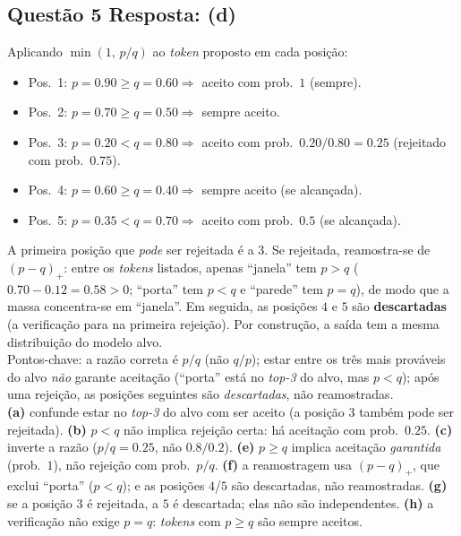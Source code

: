 \documentclass[11pt,a4paper]{article}
\begin{document}
\subsection*{Questão 5 \textemdash{} Resposta: (d)}
Aplicando $\min(1,\, p/q)$ ao \textit{token} proposto em cada posição:
\begin{itemize}
    \item Pos.\ 1: $p = 0.90 \ge q = 0.60 \Rightarrow$ aceito com prob.\ $1$ (sempre).
    \item Pos.\ 2: $p = 0.70 \ge q = 0.50 \Rightarrow$ sempre aceito.
    \item Pos.\ 3: $p = 0.20 < q = 0.80 \Rightarrow$ aceito com prob.\ $0.20/0.80 = 0.25$ (rejeitado com prob.\ $0.75$).
    \item Pos.\ 4: $p = 0.60 \ge q = 0.40 \Rightarrow$ sempre aceito (se alcançada).
    \item Pos.\ 5: $p = 0.35 < q = 0.70 \Rightarrow$ aceito com prob.\ $0.5$ (se alcançada).
\end{itemize}
A primeira posição que \emph{pode} ser rejeitada é a $3$. Se rejeitada, reamostra-se de $(p-q)_+$: entre os \textit{tokens} listados, apenas ``janela'' tem $p > q$ ($0.70 - 0.12 = 0.58 > 0$; ``porta'' tem $p < q$ e ``parede'' tem $p = q$), de modo que a massa concentra-se em ``janela''. Em seguida, as posições $4$ e $5$ são \textbf{descartadas} (a verificação para na primeira rejeição). Por construção, a saída tem a mesma distribuição do modelo alvo.\\
Pontos-chave: a razão correta é $p/q$ (não $q/p$); estar entre os três mais prováveis do alvo \emph{não} garante aceitação (``porta'' está no \textit{top-3} do alvo, mas $p < q$); após uma rejeição, as posições seguintes são \emph{descartadas}, não reamostradas.\\
\textbf{(a)} confunde estar no \textit{top-3} do alvo com ser aceito (a posição $3$ também pode ser rejeitada).
\textbf{(b)} $p < q$ não implica rejeição certa: há aceitação com prob.\ $0.25$.
\textbf{(c)} inverte a razão ($p/q = 0.25$, não $0.8/0.2$).
\textbf{(e)} $p \ge q$ implica aceitação \emph{garantida} (prob.\ $1$), não rejeição com prob.\ $p/q$.
\textbf{(f)} a reamostragem usa $(p-q)_+$, que exclui ``porta'' ($p < q$); e as posições $4$/$5$ são descartadas, não reamostradas.
\textbf{(g)} se a posição $3$ é rejeitada, a $5$ é descartada; elas não são independentes.
\textbf{(h)} a verificação não exige $p = q$: \textit{tokens} com $p \ge q$ são sempre aceitos.

\end{document}
